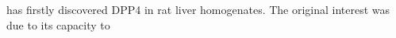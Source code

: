 \citet{Hopsu-Havu1966} has firstly discovered DPP4 in rat liver homogenates. The original interest was due to its capacity to 